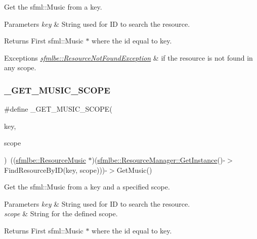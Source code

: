 Get the sfml\+::\+Music from a key. 
\begin{DoxyParams}{Parameters}
{\em key} & String used for ID to search the resource. \\
\hline
\end{DoxyParams}
\begin{DoxyReturn}{Returns}
First sfml\+::\+Music $\ast$ where the id equal to key. 
\end{DoxyReturn}

\begin{DoxyExceptions}{Exceptions}
{\em \mbox{\hyperlink{classsfmlbe_1_1_resource_not_found_exception}{sfmlbe\+::\+Resource\+Not\+Found\+Exception}}} & if the resource is not found in any scope. \\
\hline
\end{DoxyExceptions}
\mbox{\label{group___t_e_s_t___g_r_o_u_p_gaee599e12f9611ff5a4c5fe1de5d9e426}} 
\subsubsection{\texorpdfstring{\+\_\+\+G\+E\+T\+\_\+\+M\+U\+S\+I\+C\+\_\+\+S\+C\+O\+PE}{\_GET\_MUSIC\_SCOPE}}
{\footnotesize\ttfamily \#define \+\_\+\+G\+E\+T\+\_\+\+M\+U\+S\+I\+C\+\_\+\+S\+C\+O\+PE(\begin{DoxyParamCaption}\item[{}]{key,  }\item[{}]{scope }\end{DoxyParamCaption})~((\mbox{\hyperlink{classsfmlbe_1_1_resource_music}{sfmlbe\+::\+Resource\+Music}} $\ast$)(\mbox{\hyperlink{classsfmlbe_1_1_singleton_a313529b2a097425bf5500df8848ead3e}{sfmlbe\+::\+Resource\+Manager\+::\+Get\+Instance}}()-\/$>$Find\+Resource\+By\+ID(key, scope)))-\/$>$Get\+Music()}

Get the sfml\+::\+Music from a key and a specified scope. 
\begin{DoxyParams}{Parameters}
{\em key} & String used for ID to search the resource. \\
\hline
{\em scope} & String for the defined scope. \\
\hline
\end{DoxyParams}
\begin{DoxyReturn}{Returns}
First sfml\+::\+Music $\ast$ where the id equal to key. 
\end{DoxyReturn}

